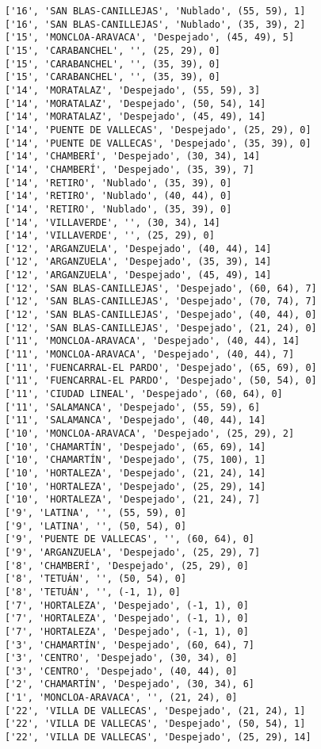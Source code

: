 \documentclass[11pt]{article}
\begin{document}
\begin{Verbatim}[commandchars=\\\{\}]
['16', 'SAN BLAS-CANILLEJAS', 'Nublado', (55, 59), 1]
['16', 'SAN BLAS-CANILLEJAS', 'Nublado', (35, 39), 2]
['15', 'MONCLOA-ARAVACA', 'Despejado', (45, 49), 5]
['15', 'CARABANCHEL', '', (25, 29), 0]
['15', 'CARABANCHEL', '', (35, 39), 0]
['15', 'CARABANCHEL', '', (35, 39), 0]
['14', 'MORATALAZ', 'Despejado', (55, 59), 3]
['14', 'MORATALAZ', 'Despejado', (50, 54), 14]
['14', 'MORATALAZ', 'Despejado', (45, 49), 14]
['14', 'PUENTE DE VALLECAS', 'Despejado', (25, 29), 0]
['14', 'PUENTE DE VALLECAS', 'Despejado', (35, 39), 0]
['14', 'CHAMBERÍ', 'Despejado', (30, 34), 14]
['14', 'CHAMBERÍ', 'Despejado', (35, 39), 7]
['14', 'RETIRO', 'Nublado', (35, 39), 0]
['14', 'RETIRO', 'Nublado', (40, 44), 0]
['14', 'RETIRO', 'Nublado', (35, 39), 0]
['14', 'VILLAVERDE', '', (30, 34), 14]
['14', 'VILLAVERDE', '', (25, 29), 0]
['12', 'ARGANZUELA', 'Despejado', (40, 44), 14]
['12', 'ARGANZUELA', 'Despejado', (35, 39), 14]
['12', 'ARGANZUELA', 'Despejado', (45, 49), 14]
['12', 'SAN BLAS-CANILLEJAS', 'Despejado', (60, 64), 7]
['12', 'SAN BLAS-CANILLEJAS', 'Despejado', (70, 74), 7]
['12', 'SAN BLAS-CANILLEJAS', 'Despejado', (40, 44), 0]
['12', 'SAN BLAS-CANILLEJAS', 'Despejado', (21, 24), 0]
['11', 'MONCLOA-ARAVACA', 'Despejado', (40, 44), 14]
['11', 'MONCLOA-ARAVACA', 'Despejado', (40, 44), 7]
['11', 'FUENCARRAL-EL PARDO', 'Despejado', (65, 69), 0]
['11', 'FUENCARRAL-EL PARDO', 'Despejado', (50, 54), 0]
['11', 'CIUDAD LINEAL', 'Despejado', (60, 64), 0]
['11', 'SALAMANCA', 'Despejado', (55, 59), 6]
['11', 'SALAMANCA', 'Despejado', (40, 44), 14]
['10', 'MONCLOA-ARAVACA', 'Despejado', (25, 29), 2]
['10', 'CHAMARTÍN', 'Despejado', (65, 69), 14]
['10', 'CHAMARTÍN', 'Despejado', (75, 100), 1]
['10', 'HORTALEZA', 'Despejado', (21, 24), 14]
['10', 'HORTALEZA', 'Despejado', (25, 29), 14]
['10', 'HORTALEZA', 'Despejado', (21, 24), 7]
['9', 'LATINA', '', (55, 59), 0]
['9', 'LATINA', '', (50, 54), 0]
['9', 'PUENTE DE VALLECAS', '', (60, 64), 0]
['9', 'ARGANZUELA', 'Despejado', (25, 29), 7]
['8', 'CHAMBERÍ', 'Despejado', (25, 29), 0]
['8', 'TETUÁN', '', (50, 54), 0]
['8', 'TETUÁN', '', (-1, 1), 0]
['7', 'HORTALEZA', 'Despejado', (-1, 1), 0]
['7', 'HORTALEZA', 'Despejado', (-1, 1), 0]
['7', 'HORTALEZA', 'Despejado', (-1, 1), 0]
['3', 'CHAMARTÍN', 'Despejado', (60, 64), 7]
['3', 'CENTRO', 'Despejado', (30, 34), 0]
['3', 'CENTRO', 'Despejado', (40, 44), 0]
['2', 'CHAMARTÍN', 'Despejado', (30, 34), 6]
['1', 'MONCLOA-ARAVACA', '', (21, 24), 0]
['22', 'VILLA DE VALLECAS', 'Despejado', (21, 24), 1]
['22', 'VILLA DE VALLECAS', 'Despejado', (50, 54), 1]
['22', 'VILLA DE VALLECAS', 'Despejado', (25, 29), 14]

\end{Verbatim}
\end{document}
